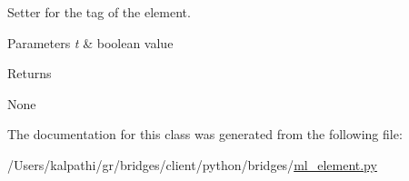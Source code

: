 Setter for the tag of the element. 


\begin{DoxyParams}{Parameters}
{\em t} & boolean value \\
\hline
\end{DoxyParams}
\begin{DoxyReturn}{Returns}


None 
\end{DoxyReturn}


The documentation for this class was generated from the following file\+:\begin{DoxyCompactItemize}
\item 
/\+Users/kalpathi/gr/bridges/client/python/bridges/\mbox{\hyperlink{ml__element_8py}{ml\+\_\+element.\+py}}\end{DoxyCompactItemize}
